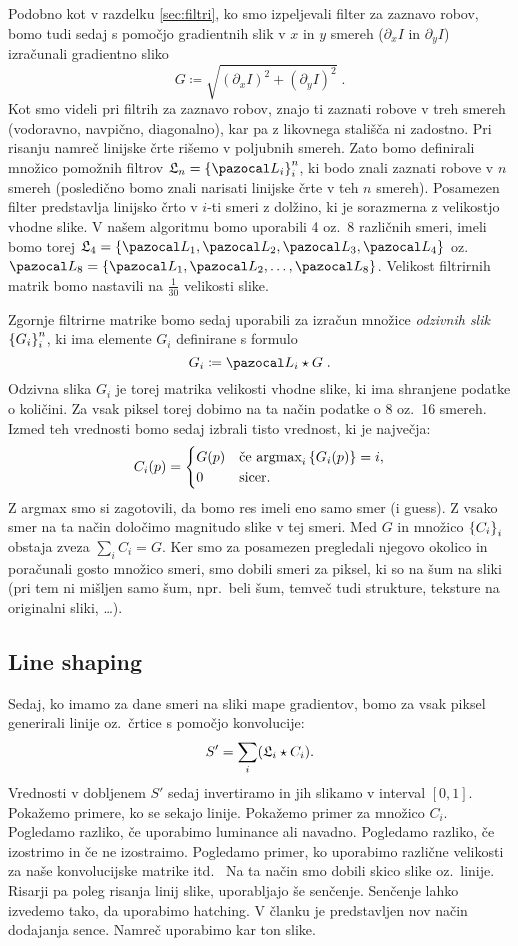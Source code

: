 Podobno kot v razdelku \ref{sec:filtri}, ko smo izpeljevali filter za zaznavo robov, bomo tudi sedaj s pomočjo gradientnih slik v $x$ in $y$ smereh ($\partial_x I$ in $\partial_y I$) izračunali gradientno sliko
%
$$G \coloneqq \sqrt{(\partial_x I)^2 + (\partial_y I)^2} \;.$$
%
Kot smo videli pri filtrih za zaznavo robov, znajo ti zaznati robove v treh smereh (vodoravno, navpično, diagonalno), kar pa z likovnega stališča ni zadostno. Pri risanju namreč linijske črte rišemo v poljubnih smereh. Zato bomo definirali množico pomožnih filtrov $\L_n = \set{\LL_i}_i^n$, ki bodo znali zaznati robove v $n$ smereh (posledično bomo znali narisati linijske črte v teh $n$ smereh). Posamezen filter predstavlja linijsko črto v $i$-ti smeri z dolžino, ki je sorazmerna z velikostjo vhodne slike. V našem algoritmu bomo uporabili 4 oz.\ 8 različnih smeri, imeli bomo torej $\L_4 = \set{\LL_1, \LL_2, \LL_3, \LL_4}$ oz.\ $\LL_8 = \set{\LL_1, \LL_2, \ldots, \LL_8}$. Velikost filtrirnih matrik bomo nastavili na $\frac{1}{30}$ velikosti slike.

Zgornje filtrirne matrike bomo sedaj uporabili za izračun množice \emph{odzivnih slik} $\left\{G_i\right\}_i^n$, ki ima elemente $G_i$ definirane s formulo
%
$$G_i \coloneqq \LL_i \star G \;.$$
%
Odzivna slika $G_i$ je torej matrika velikosti vhodne slike, ki ima shranjene podatke o količini. Za vsak piksel torej dobimo na ta način podatke o 8 oz.\ 16 smereh. Izmed teh vrednosti bomo sedaj izbrali tisto vrednost, ki je največja:
%
$$
C_i(p) =
\begin{cases}
  G(p) & \mbox{če } \textup{argmax}_i\left\{G_i(p)\right\} = i, \\ 
  0      & \mbox{sicer}.
\end{cases}
$$
%
Z argmax smo si zagotovili, da bomo res imeli eno samo smer (i guess). Z vsako smer na ta način določimo magnitudo slike v tej smeri. Med $G$ in množico $\left\{C_i\right\}_i$ obstaja zveza $\sum_{i} C_i = G$. Ker smo za posamezen pregledali njegovo okolico in poračunali gosto množico smeri, smo dobili smeri za piksel, ki so na šum na sliki (pri tem ni mišljen samo šum, npr.\ beli šum, temveč tudi strukture, teksture na originalni sliki, \ldots). 
\subsection{Line shaping}
Sedaj, ko imamo za dane smeri na sliki mape gradientov, bomo za vsak piksel generirali linije oz.\ črtice s pomočjo konvolucije:
$$S' = \sum_i (\mathfrak L_i \star C_i).$$
Vrednosti v dobljenem $S'$ sedaj invertiramo in jih slikamo v interval $[0, 1]$.
%
Pokažemo primere, ko se sekajo linije. Pokažemo primer za množico $C_i$. Pogledamo razliko, če uporabimo luminance ali navadno. Pogledamo razliko, če izostrimo in če ne izostraimo. Pogledamo primer, ko uporabimo različne velikosti za naše konvolucijske matrike itd.\ 
%
Na ta način smo dobili skico slike oz.\ linije. Risarji pa poleg risanja linij slike, uporabljajo še senčenje. Senčenje lahko izvedemo tako, da uporabimo hatching. V članku je predstavljen nov način dodajanja sence. Namreč uporabimo kar ton slike.
